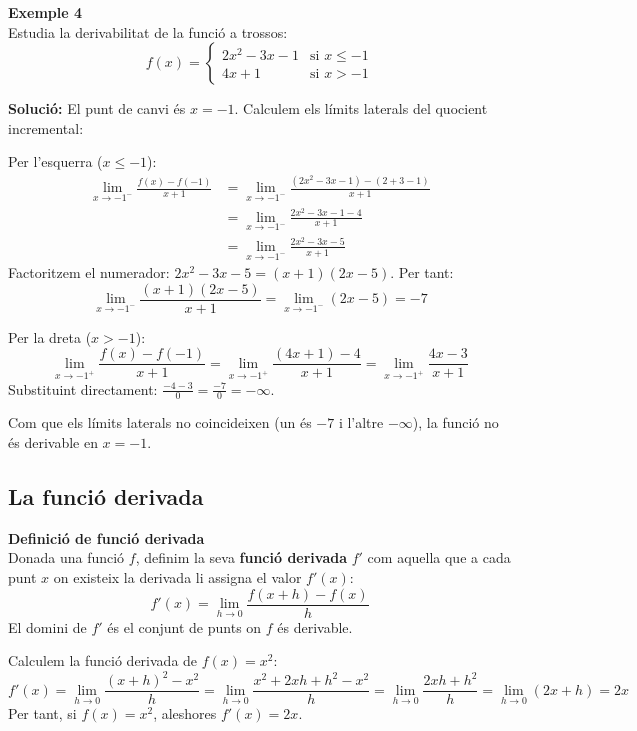 \documentclass[12pt]{article}
\begin{document}
\begin{exemple}
\textbf{Exemple 4}\\
Estudia la derivabilitat de la funció a trossos:
\[
f(x)=
\begin{cases}
2x^2-3x-1 & \text{si } x\le -1 \\
4x+1 & \text{si } x>-1
\end{cases}
\]

\textbf{Solució:}
El punt de canvi és $x=-1$. Calculem els límits laterals del quocient incremental:

Per l'esquerra ($x\le -1$):
\begin{align*}
\lim_{x\to -1^-} \frac{f(x)-f(-1)}{x+1} 
&= \lim_{x\to -1^-} \frac{(2x^2-3x-1) - (2+3-1)}{x+1} \\
&= \lim_{x\to -1^-} \frac{2x^2-3x-1 - 4}{x+1} \\
&= \lim_{x\to -1^-} \frac{2x^2-3x-5}{x+1}
\end{align*}
Factoritzem el numerador: $2x^2-3x-5 = (x+1)(2x-5)$. Per tant:
\[
\lim_{x\to -1^-} \frac{(x+1)(2x-5)}{x+1}
= \lim_{x\to -1^-} (2x-5) = -7
\]

Per la dreta ($x>-1$):
\[
\lim_{x\to -1^+} \frac{f(x)-f(-1)}{x+1}
= \lim_{x\to -1^+} \frac{(4x+1)-4}{x+1}
= \lim_{x\to -1^+} \frac{4x-3}{x+1}
\]
Substituint directament: $\frac{-4-3}{0} = \frac{-7}{0} = -\infty$.

Com que els límits laterals no coincideixen (un és $-7$ i l'altre $-\infty$), la funció no és derivable en $x=-1$.
\end{exemple}


\subsection{La funció derivada}

\begin{concept}
\textbf{Definició de funció derivada}\\
Donada una funció $f$, definim la seva \textbf{funció derivada} $f'$ com aquella que a cada punt $x$ on existeix la derivada li assigna el valor $f'(x)$:
\[
\boxed{f'(x)=\lim_{h\to 0} \frac{f(x+h)-f(x)}{h}}
\]
El domini de $f'$ és el conjunt de punts on $f$ és derivable.
\end{concept}

\begin{exemple}
Calculem la funció derivada de $f(x)=x^2$:
\[
f'(x)=\lim_{h\to 0} \frac{(x+h)^2-x^2}{h}
      =\lim_{h\to 0} \frac{x^2+2xh+h^2-x^2}{h}
      =\lim_{h\to 0} \frac{2xh+h^2}{h}
      =\lim_{h\to 0} (2x+h)=2x
\]
Per tant, si $f(x)=x^2$, aleshores $f'(x)=2x$.
\end{exemple}
\end{document}
